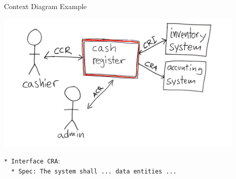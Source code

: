 \begin{Slide}{Context Diagram Example}
\begin{minipage}[t]{1.0\textwidth}
\vspace{-1em}\includegraphics[width=0.9\textwidth]{../img/context-diagram-example}
\end{minipage}%
\vspace{1em}
\texttt{*~Interface~CRA}:\\ 
  \texttt{~~*~Spec:~The system shall ...~data entities ...}
\end{Slide}
